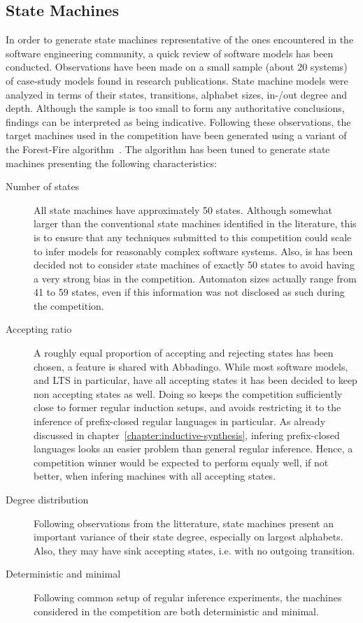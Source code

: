 \subsection{State Machines\label{subsection:stamina-machines}}

In order to generate state machines representative of the ones encountered in the software engineering community, a quick review of software models has been conducted. Observations have been made on a small sample (about 20 systems) of case-study models found in research publications. State machine models were analyzed in terms of their states, transitions, alphabet sizes, in-/out degree and depth. Although the sample is too small to form any authoritative conclusions, findings can be interpreted as being indicative. Following these observations, the target machines used in the competition have been generated using a variant of the Forest-Fire algorithm~\cite{Leskovec2007}. The algorithm has been tuned to generate state machines presenting the following characteristics:

\begin{description}

\item[Number of states] All state machines have approximately 50 states. Although somewhat larger than the conventional state machines identified in the literature, this is to ensure that any techniques submitted to this competition could scale to infer models for reasonably complex software systems. Also, is has been decided not to consider state machines of exactly 50 states to avoid having a very strong bias in the competition. Automaton sizes actually range from 41 to 59 states, even if this information was not disclosed as such during the competition.

\item[Accepting ratio] A roughly equal proportion of accepting and rejecting states has been chosen, a feature is shared with Abbadingo. While most software models, and LTS in particular, have all accepting states it has been decided to keep non accepting states as well. Doing so keeps the competition sufficiently close to former regular induction setups, and avoids restricting it to the inference of prefix-closed regular languages in particular. As already discussed in chapter~\ref{chapter:inductive-synthesis}, infering prefix-closed languages looks an easier problem than general regular inference. Hence, a competition winner would be expected to perform equaly well, if not better, when infering machines with all accepting states.

\item[Degree distribution] Following observations from the litterature, state machines present an important variance of their state degree, especially on largest alphabets. Also, they may have sink accepting states, i.e. with no outgoing transition.

\item[Deterministic and minimal] Following common setup of regular inference experiments, the machines considered in the competition are both deterministic and minimal.

\end{description}

